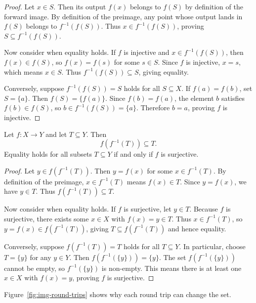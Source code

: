 \begin{proof}
Let $x \in S$. Then its output $f(x)$ belongs to $f(S)$ by definition of the forward image. By definition of the preimage, any point whose output lands in $f(S)$ belongs to $f^{-1}(f(S))$. Thus $x \in f^{-1}(f(S))$, proving $S \subseteq f^{-1}(f(S))$.

Now consider when equality holds.
If $f$ is injective and $x \in f^{-1}(f(S))$, then $f(x) \in f(S)$, so $f(x) = f(s)$ for some $s \in S$. Since $f$ is injective, $x = s$, which means $x \in S$. Thus $f^{-1}(f(S)) \subseteq S$, giving equality.

Conversely, suppose $f^{-1}(f(S)) = S$ holds for all $S \subseteq X$. If $f(a) = f(b)$, set $S = \{a\}$. Then $f(S) = \{f(a)\}$. Since $f(b) = f(a)$, the element $b$ satisfies $f(b) \in f(S)$, so $b \in f^{-1}(f(S)) = \{a\}$. Therefore $b = a$, proving $f$ is injective.
\end{proof}

\begin{theorem}
Let $f: X \to Y$ and let $T \subseteq Y$. Then
\[
f(f^{-1}(T)) \subseteq T.
\]
Equality holds for all subsets $T \subseteq Y$ if and only if $f$ is surjective.
\end{theorem}

\begin{proof}
Let $y \in f(f^{-1}(T))$. Then $y = f(x)$ for some $x \in f^{-1}(T)$. By definition of the preimage, $x \in f^{-1}(T)$ means $f(x) \in T$. Since $y = f(x)$, we have $y \in T$. Thus $f(f^{-1}(T)) \subseteq T$.

Now consider when equality holds.
If $f$ is surjective, let $y \in T$. Because $f$ is surjective, there exists some $x \in X$ with $f(x) = y \in T$. Thus $x \in f^{-1}(T)$, so $y = f(x) \in f(f^{-1}(T))$, giving $T \subseteq f(f^{-1}(T))$ and hence equality.

Conversely, suppose $f(f^{-1}(T)) = T$ holds for all $T \subseteq Y$. In particular, choose $T = \{y\}$ for any $y \in Y$. Then $f(f^{-1}(\{y\})) = \{y\}$. The set $f(f^{-1}(\{y\}))$ cannot be empty, so $f^{-1}(\{y\})$ is non-empty. This means there is at least one $x \in X$ with $f(x) = y$, proving $f$ is surjective.
\end{proof}

Figure~\ref{fig:img-round-trips} shows why each round trip can change the set.

